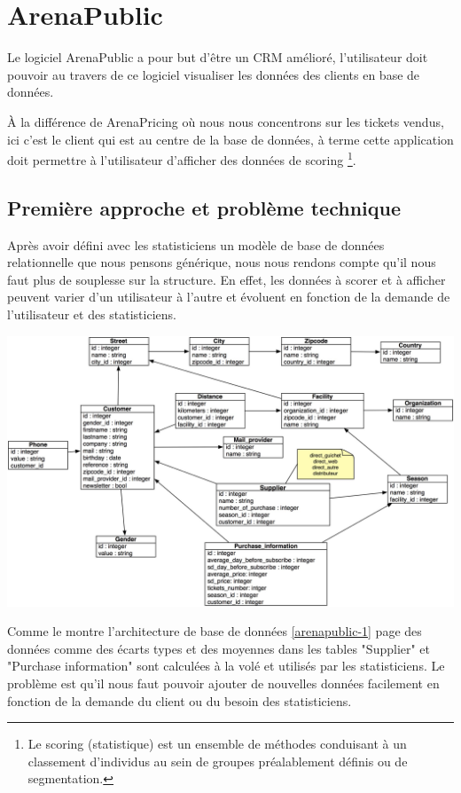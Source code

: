 \section{ArenaPublic}
Le logiciel ArenaPublic a pour but d'être un CRM amélioré, l'utilisateur doit pouvoir au travers de ce logiciel visualiser les données des clients en base de données. 

À la différence de ArenaPricing où nous nous concentrons sur les tickets vendus, ici c'est le client qui est au centre de la base de données, à terme cette application doit permettre à l'utilisateur d'afficher des données de scoring \footnote{Le scoring (statistique) est un ensemble de méthodes conduisant à un classement d'individus au sein de groupes préalablement définis ou de segmentation.}.


\subsection{Première approche et problème technique}
Après avoir défini avec les statisticiens un modèle de base de données relationnelle que nous pensons générique, nous nous rendons compte qu'il nous faut plus de souplesse sur la structure. En effet, les données à scorer et à afficher peuvent varier d'un utilisateur à l'autre et évoluent en fonction de la demande de l'utilisateur et des statisticiens.

\begin{center}
\includegraphics[scale=0.2]{images/arenapublic-1.jpg}
\label{arenapublic-1}
\end{center}


Comme le montre l'architecture de base de données \ref{arenapublic-1} page \pageref{arenapublic-1} des données comme des écarts types et des moyennes dans les tables "Supplier" et "Purchase information" sont calculées à la volé et utilisés par les statisticiens. Le problème est qu'il nous faut pouvoir ajouter de nouvelles données facilement en fonction de la demande du client ou du besoin des statisticiens.
\\

